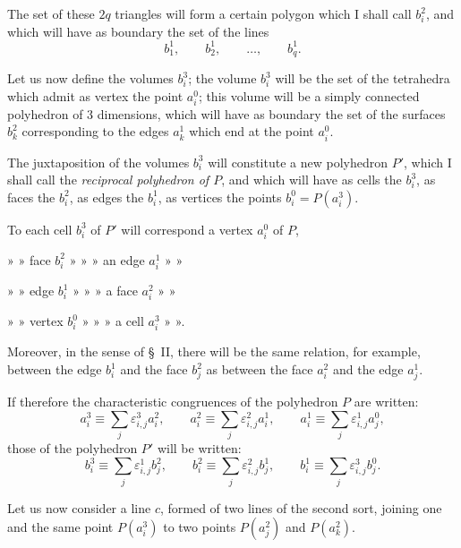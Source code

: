 \documentclass{article}
\begin{document}
The set of these $2q$ triangles will form a certain polygon which I shall call $b^{2}_{i}$, and which will have as boundary the set of the lines
\[ b^{1}_{1}, \qquad b^{1}_{2}, \qquad \ldots, \qquad b^{1}_{q}. \]

Let us now define the volumes $b^{3}_{i}$; the volume $b^{3}_{i}$ will be the set of the tetrahedra which admit as vertex the point $a^{0}_{i}$; this volume will be a simply connected polyhedron of 3 dimensions, which will have as boundary the set of the surfaces $b^{2}_{k}$ corresponding to the edges $a^{1}_{k}$ which end at the point $a^{0}_{i}$.

The juxtaposition of the volumes $b^{3}_{i}$ will constitute a new polyhedron $P'$, which I shall call the \emph{reciprocal polyhedron of $P$}, and which will have as cells the $b^{3}_{i}$, as faces the $b^{2}_{i}$, as edges the $b^{1}_{i}$, as vertices the points $b^{0}_{i} = P(a^{3}_{i})$.

To each cell $b^{3}_{i}$ of $P'$ will correspond a vertex $a^{0}_{i}$ of $P$,

» » face $b^{2}_{i}$ » » » an edge $a^{1}_{i}$ » »

» » edge $b^{1}_{i}$ » » » a face $a^{2}_{i}$ » »

» » vertex $b^{0}_{i}$ » » » a cell $a^{3}_{i}$ » ».

Moreover, in the sense of \S~II, there will be the same relation, for example, between the edge $b^{1}_{i}$ and the face $b^{2}_{j}$ as between the face $a^{2}_{i}$ and the edge $a^{1}_{j}$.

If therefore the characteristic congruences of the polyhedron $P$ are written:
\[ a^{3}_{i} \equiv \sum_{j} \varepsilon^{3}_{i,j} a^{2}_{i}, \qquad a^{2}_{i} \equiv \sum_{j} \varepsilon^{2}_{i,j} a^{1}_{i}, \qquad a^{1}_{i} \equiv \sum_{j} \varepsilon^{1}_{i,j} a^{0}_{j}, \]
those of the polyhedron $P'$ will be written:
\[ b^{3}_{i} \equiv \sum_{j} \varepsilon^{1}_{i,j} b^{2}_{j}, \qquad b^{2}_{i} \equiv \sum_{j} \varepsilon^{2}_{i,j} b^{1}_{j}, \qquad b^{1}_{i} \equiv \sum_{j} \varepsilon^{3}_{i,j} b^{0}_{j}. \]

Let us now consider a line $c$, formed of two lines of the second sort, joining one and the same point $P(a^{3}_{i})$ to two points $P(a^{2}_{j})$ and $P(a^{2}_{k})$.
\end{document}
